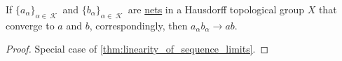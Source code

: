 \begin{proposition}\label{thm:limits_are_topological_group_homomorphisms}
  If \( \{ a_\alpha \}_{\alpha \in \mscrK} \) and \( \{ b_\alpha \}_{\alpha \in \mscrK} \) are \hyperref[def:topological_net]{nets} in a Hausdorff topological group \( X \) that converge to \( a \) and \( b \), correspondingly, then \( a_\alpha b_\alpha \to a b \).
\end{proposition}
\begin{proof}
  Special case of \cref{thm:linearity_of_sequence_limits}.
\end{proof}
